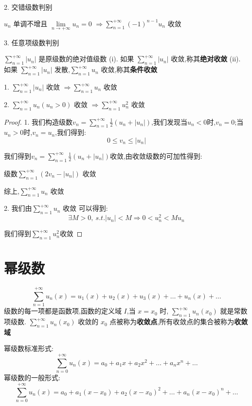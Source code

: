 2. 交错级数判别
\begin{theorem}[莱布尼茨判别法]
	$u_{n}$ 单调不增且 $\lim\limits_{n\rightarrow +\infty}u_{n}=0$  $\Rightarrow\sum\limits_{n=1}^{+\infty}(-1)^{n-1}u_{n}$ 收敛
\end{theorem}
3. 任意项级数判别
\begin{definition}
	$\sum\limits_{n=1}^{+\infty}|u_{n}|$ 是原级数的绝对值级数
	(i). 如果 $\sum\limits_{n=1}^{+\infty}|u_{n}|$ 收敛,称其\textbf{绝对收敛}
	(ii). 如果 $\sum\limits_{n=1}^{+\infty}|u_{n}|$ 发散,$\sum\limits_{n=1}^{+\infty}u_{n}$ 收敛,称其\textbf{条件收敛}
\end{definition}
\begin{theorem}
	1. $\sum\limits_{n=1}^{+\infty}|u_{n}|$ 收敛 $\Rightarrow\sum\limits_{n=1}^{+\infty}u_{n}$ 收敛

	2. $\sum\limits_{n=1}^{+\infty}u_{n}(u_{n}>0)$ 收敛 $\Rightarrow\sum\limits_{n=1}^{+\infty}u_{n}^2$ 收敛
\end{theorem}
\begin{proof}

	1. 我们构造级数$v_{n}=\sum\limits_{n=1}^{+\infty}\frac{1}{2}(u_{n}+|u_{n}|)$,我们发现当$u_{n}<0$时,$v_{n}=0$;当$u_{n}>0$时,$v_{n}=u_{n}$,我们得到:
	$$0\leq v_{n}\leq |u_{n}|$$

	我们得到$v_{n}=\sum\limits_{n=1}^{+\infty}\frac{1}{2}(u_{n}+|u_{n}|)$收敛,由收敛级数的可加性得到:

	级数$\sum\limits_{n=1}^{+\infty}(2v_{n}-|u_{n}|)$ 收敛

	综上,$\sum\limits_{n=1}^{+\infty}u_{n}$ 收敛


	2. 我们由$\sum\limits_{n=1}^{+\infty}u_{n}$ 收敛 可以得到:
	$$\exists M>0,\ s.t. |u_{n}|<M\Rightarrow 0<u_{n}^2<Mu_{n}$$

	我们得到$\sum\limits_{n=1}^{+\infty}u_{n}^2$收敛
\end{proof}
\section{幂级数}
\begin{definition}[幂级数]
	$$\sum\limits_{n=1}^{+\infty}u_{n}(x)=u_{1}(x)+u_{2}(x)+u_{3}(x)+\dots+u_{n}(x)+\dots$$
	级数的每一项都是函数项,函数的定义域 $I$,当 $x=x_{0}$ 时, $\sum\limits_{n=1}^{+\infty}u_{n}(x_{0})$ 就是常数项级数.
	$\sum\limits_{n=1}^{+\infty}u_{n}(x_{0})$ 收敛的 $x_{0}$ 点被称为\textbf{收敛点},所有收敛点的集合被称为\textbf{收敛域}
\end{definition}
\begin{definition}
	幂级数标准形式:
	$$\sum\limits_{n=0}^{+\infty}u_{n}(x)=a_{0}+a_{1}x+a_{2}x^{2}+\dots+a_{n}x^{n}+\dots$$
	幂级数的一般形式:
	$$\sum\limits_{n=0}^{+\infty}u_{n}(x)=a_{0}+a_{1}(x-x_{0})+a_{2}(x-x_{0})^{2}+\dots+a_{n}(x-x_{0})^{n}+\dots$$
\end{definition}



